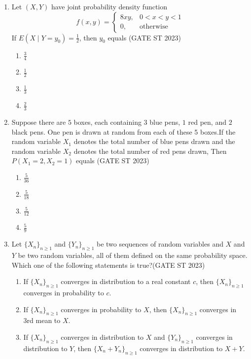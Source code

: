 \documentclass[journal]{IEEEtran}
\begin{document}
\begin{enumerate}[label=\textbf{Q.\arabic*.}, start=11, align=left, itemsep=2em]
\item Let $(X,Y)$ have joint probability density function
\[ f(x,y) = \begin{cases}
8xy, & 0 < x < y < 1 \\
0, & \text{otherwise}
\end{cases} \]
If $E(X \mid Y = y_0) = \frac12$, then $y_0$ equals \hfill(GATE ST 2023) 
\begin{enumerate}
    \item $\frac{3}{4}$
    \item $\frac{1}{2}$
    \item $\frac{1}{3}$
    \item $\frac{2}{3}$
\end{enumerate}

\item Suppose there are $5$ boxes, each containing $3$ blue pens, $1$ red pen, and $2$ black pens. One pen is drawn at random from each of these 5 boxes.If the random variable $X_1$ denotes the total number of blue pens drawn and the random variable $X_2$ denotes the total  number of red pens drawn, Then $P(X_1 = 2, X_2 = 1)$ equals  \hfill(GATE ST 2023)
\begin{enumerate}
    \item $\frac{5}{36}$
    \item $\frac{5}{18}$
    \item $\frac{5}{12}$
    \item $\frac{5}{9}$
\end{enumerate}

\item Let $\{X_n\}_{n \geq 1}$ and $\{Y_n\}_{n \geq 1}$ be two sequences of random variables and $X$ and $Y$ be two random variables, all of them defined on the same probability space. Which one of the following statements is true?\hfill(GATE ST 2023)

\begin{enumerate}
    \item If $\{X_n\}_{n \geq 1}$ converges in distribution to a real constant $c$, then $\{X_n\}_{n \geq 1}$ converges in probability to $c$.
    
    \item If $\{X_n\}_{n \geq 1}$ converges in probability to $X$, then $\{X_n\}_{n \geq 1}$ converges in 3rd mean to $X$.
    
    \item If $\{X_n\}_{n \geq 1}$ converges in distribution to $X$ and $\{Y_n\}_{n \geq 1}$ converges in distribution to $Y$, then $\{X_n + Y_n\}_{n \geq 1}$ converges in distribution to $X + Y$.
    

\end{enumerate}
\end{enumerate}
\end{document}
